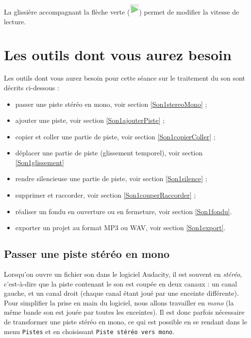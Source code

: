 \begin{itemize}


La glissière accompagnant la flèche verte (\includegraphics[angle=0,width=.4cm]{./images/son01/fleche_verte}) permet de modifier la vitesse de lecture.

\end{itemize}





\section{Les outils dont vous aurez besoin}\label{Son5eOutils}

Les outils dont vous aurez besoin pour cette séance sur le traitement du son sont décrits ci-dessous :

\begin{itemize}   
\item passer une piste stéréo en mono, voir section \vref{Son1stereoMono} ;
\item ajouter une piste, voir section \vref{Son1ajouterPiste} ;
\item copier et coller une partie de piste, voir section \vref{Son1copierColler} ;
\item déplacer une partie de piste (glissement temporel), voir section \vref{Son1glissement}
\item rendre silencieuse une partie de piste, voir section \vref{Son1silence} ;
\item supprimer et raccorder, voir section \vref{Son1couperRaccorder} ;
\item réaliser un fondu en ouverture ou en fermeture, voir section \vref{Son1fondu}.
\item exporter un projet au format MP3 ou WAV, voir section \vref{Son1export}.
\end{itemize} 



\subsection{Passer une piste stéréo en mono}\label{Son1stereoMono} 

Lorsqu'on ouvre un fichier son dans le logiciel Audacity, il est souvent en \emph{stéréo}, c'est-à-dire que la piste contenant le son est coupée en deux canaux : un canal gauche, et un canal droit (chaque canal étant joué par une enceinte différente). Pour simplifier la prise en main du logiciel, nous allons travailler en \emph{mono} (la même bande son est jouée par toutes les enceintes). Il est donc parfois nécessaire de transformer une piste stéréo en mono, ce qui est possible en se rendant dans le menu \texttt{Pistes} et en choisissant \texttt{Piste stéréo vers mono}.    

